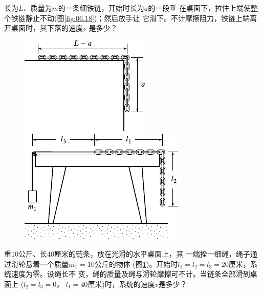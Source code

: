 \begin{exercises}
\exercise 长为$ L $、质量为$ m $的一条细铁链，开始时长为$ a $的一段垂
在桌面下，拉住上端使整个铁链静止不动(图\ref{fig:06.18})；然后放手让
它滑下。不计摩擦阻力，铁链上端离开桌面时，其下落的速度$ v $
是多少？
\begin{figure}[h]
  \begin{minipage}[b]{0.4\linewidth}
    \centering
    \includegraphics{figure/fig06.18}
    \caption{}
    \label{fig:06.18}
  \end{minipage}
  \hfill
  \begin{minipage}[b]{0.6\linewidth}
    \centering
    \includegraphics{figure/fig06.19}
    \caption{}
    \label{fig:06.19}
  \end{minipage}
    \vspace{-0.8em}
\end{figure}

\exercise 重10公斤、长40厘米的链条，放在光滑的水平桌面上，其
一端拴一细绳，绳子通过滑轮悬着一个质量$ m _ { 1 } = 10 $公斤的物体
(图\ref{fig:06.19})。开始时$ l _ { 1 } = l _ { 2 } = l _ { 3 } = 20 $厘米，系统速度为零。设绳长不
变，绳的质量及绳与滑轮摩擦可不计。当链条全部滑到桌面上
($ l _ { 2 } = l _ { 3 } = 0 $， $ l _ { 1 } = 40 $厘米)时，系统的速度$ v $是多少？


\end{exercises}
